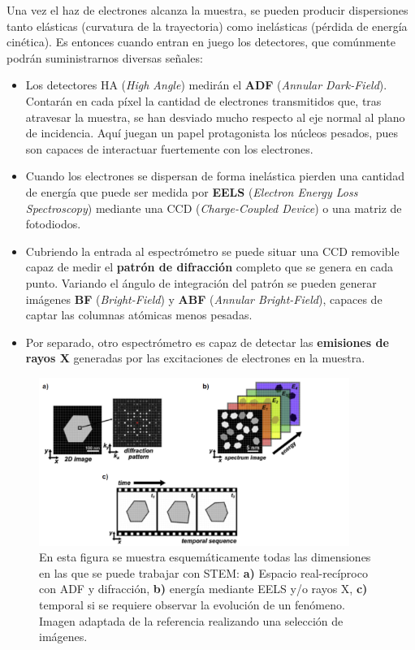 Una vez el haz de electrones alcanza la muestra, se pueden producir dispersiones tanto elásticas (curvatura de la trayectoria) como inelásticas (pérdida de energía cinética). Es entonces cuando entran en juego los detectores, que comúnmente podrán suministrarnos diversas señales:

\begin{itemize}
    \item Los detectores HA (\textit{High Angle})  medirán el \textbf{ADF} (\textit{Annular Dark-Field}). Contarán en cada píxel la cantidad de electrones transmitidos que, tras atravesar la muestra, se han desviado mucho respecto al eje normal al plano de incidencia. Aquí juegan un papel protagonista los núcleos pesados, pues son capaces de interactuar fuertemente con los electrones.
    
    \item Cuando los electrones se dispersan de forma inelástica pierden una cantidad de energía que puede ser medida por \textbf{EELS} (\textit{Electron Energy Loss Spectroscopy}) mediante una CCD (\textit{Charge-Coupled Device}) o una matriz de fotodiodos.
    
    \item Cubriendo la entrada al espectrómetro se puede situar una CCD removible capaz de medir el \textbf{patrón de difracción} completo que se genera en cada punto. Variando el ángulo de integración del patrón se pueden generar imágenes \textbf{BF} (\textit{Bright-Field}) y \textbf{ABF} (\textit{Annular Bright-Field}), capaces de captar las columnas atómicas menos pesadas.
    
    \item Por separado, otro espectrómetro es capaz de detectar las \textbf{emisiones de rayos X} generadas por las excitaciones de electrones en la muestra.
\end{itemize}

\vspace{0.1cm}

\begin{figure}[h!]
    \centering
    \includegraphics[width=0.9\textwidth]{fig/Fig2.png}
    \caption{En esta figura se muestra esquemáticamente todas las dimensiones en las que se puede trabajar con STEM: \textbf{a)} Espacio real-recíproco con ADF y difracción, \textbf{b)} energía mediante EELS y/o rayos X, \textbf{c)} temporal si se requiere observar la evolución de un fenómeno. Imagen adaptada de la referencia \cite{foto_intro} realizando una selección de imágenes.}
    \label{fig:2}
\end{figure}

